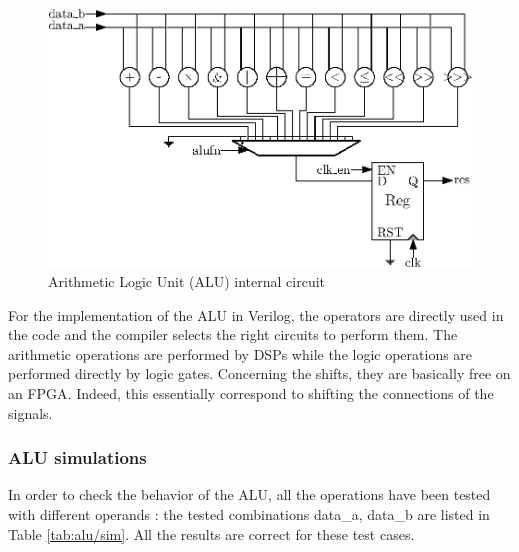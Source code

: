 \begin{figure}[H]
    \centering
    \includegraphics[width=\linewidth]{Chapter3-CPU/res/alu_internal}
    \caption{Arithmetic Logic Unit (ALU) internal circuit}
    \label{fig:components/alu_in}
\end{figure}


For the implementation of the ALU in Verilog, the operators are directly used in the code and the 
compiler selects the right circuits to perform them. The arithmetic operations are 
performed by DSPs while the logic operations are performed directly by logic gates. Concerning the
shifts, they are basically free on an FPGA. Indeed, this essentially correspond to shifting the 
connections of the signals.

\subsubsection*{ALU simulations}

In order to check the behavior of the ALU, all the operations have been tested with different 
operands : the tested combinations data\_a, data\_b are listed in Table \ref{tab:alu/sim}. 
All the results are correct for these test cases.

